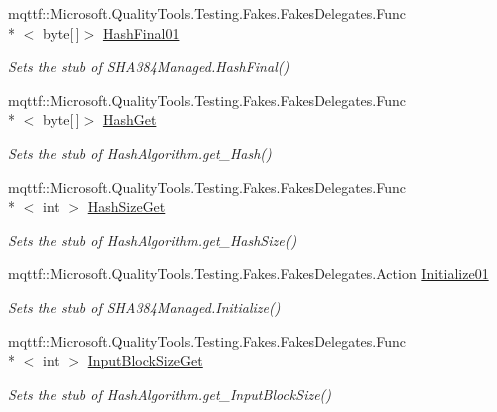 \begin{DoxyCompactItemize}
mqttf\-::\-Microsoft.\-Quality\-Tools.\-Testing.\-Fakes.\-Fakes\-Delegates.\-Func\\*
$<$ byte\mbox{[}$\,$\mbox{]}$>$ \hyperlink{class_system_1_1_security_1_1_cryptography_1_1_fakes_1_1_stub_s_h_a384_managed_a8b5422ea8f27f704a3be6a5dd42308ba}{Hash\-Final01}
\begin{DoxyCompactList}\small\item\em Sets the stub of S\-H\-A384\-Managed.\-Hash\-Final()\end{DoxyCompactList}\item 
mqttf\-::\-Microsoft.\-Quality\-Tools.\-Testing.\-Fakes.\-Fakes\-Delegates.\-Func\\*
$<$ byte\mbox{[}$\,$\mbox{]}$>$ \hyperlink{class_system_1_1_security_1_1_cryptography_1_1_fakes_1_1_stub_s_h_a384_managed_ac088e936e6fe25d17491bb9d1d9bee3b}{Hash\-Get}
\begin{DoxyCompactList}\small\item\em Sets the stub of Hash\-Algorithm.\-get\-\_\-\-Hash()\end{DoxyCompactList}\item 
mqttf\-::\-Microsoft.\-Quality\-Tools.\-Testing.\-Fakes.\-Fakes\-Delegates.\-Func\\*
$<$ int $>$ \hyperlink{class_system_1_1_security_1_1_cryptography_1_1_fakes_1_1_stub_s_h_a384_managed_a62835357b9e16badaf09a1e32e2719db}{Hash\-Size\-Get}
\begin{DoxyCompactList}\small\item\em Sets the stub of Hash\-Algorithm.\-get\-\_\-\-Hash\-Size()\end{DoxyCompactList}\item 
mqttf\-::\-Microsoft.\-Quality\-Tools.\-Testing.\-Fakes.\-Fakes\-Delegates.\-Action \hyperlink{class_system_1_1_security_1_1_cryptography_1_1_fakes_1_1_stub_s_h_a384_managed_a904161d0fc0cddfcaeb68d54de8f3eda}{Initialize01}
\begin{DoxyCompactList}\small\item\em Sets the stub of S\-H\-A384\-Managed.\-Initialize()\end{DoxyCompactList}\item 
mqttf\-::\-Microsoft.\-Quality\-Tools.\-Testing.\-Fakes.\-Fakes\-Delegates.\-Func\\*
$<$ int $>$ \hyperlink{class_system_1_1_security_1_1_cryptography_1_1_fakes_1_1_stub_s_h_a384_managed_adb04afc61d28ee92f534912602c4a4f9}{Input\-Block\-Size\-Get}
\begin{DoxyCompactList}\small\item\em Sets the stub of Hash\-Algorithm.\-get\-\_\-\-Input\-Block\-Size()\end{DoxyCompactList}\item 

\end{DoxyCompactItemize}
